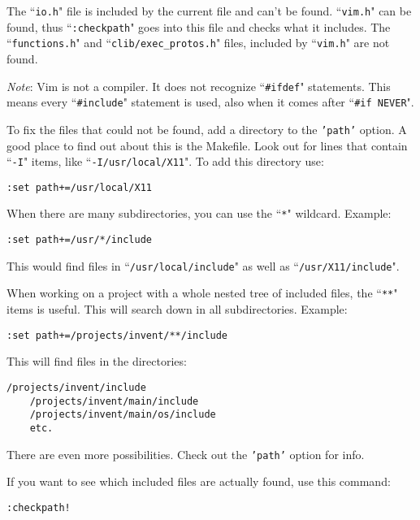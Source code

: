 The ``\texttt{io.h}" file is included by the current file and can't be found.
``\texttt{vim.h}" can be found, thus ``\texttt{:checkpath}" goes into this file and checks what it includes.
The ``\texttt{functions.h}" and ``\texttt{clib/exec\_protos.h}" files, included by ``\texttt{vim.h}" are not found.

\emph{Note}:
Vim is not a compiler.
It does not recognize ``\texttt{\#ifdef}" statements.
This means every ``\texttt{\#include}" statement is used, also when it comes after ``\texttt{\#if NEVER}".

To fix the files that could not be found, add a directory to the \texttt{'path'} option.
A good place to find out about this is the Makefile.
Look out for lines that contain ``\texttt{-I}" items, like ``\texttt{-I/usr/local/X11}".
To add this directory use:

\begin{Verbatim}[samepage=true]
 :set path+=/usr/local/X11
\end{Verbatim}

When there are many subdirectories, you can use the ``\texttt{*}" wildcard.
Example:

\begin{Verbatim}[samepage=true]
 :set path+=/usr/*/include
\end{Verbatim}

This would find files in ``\texttt{/usr/local/include}" as well as ``\texttt{/usr/X11/include}".

When working on a project with a whole nested tree of included files, the ``\texttt{**}" items is useful.
This will search down in all subdirectories.
Example:

\begin{Verbatim}[samepage=true]
 :set path+=/projects/invent/**/include
\end{Verbatim}

This will find files in the directories:

\begin{Verbatim}[samepage=true]
    /projects/invent/include
    /projects/invent/main/include
    /projects/invent/main/os/include
    etc.
\end{Verbatim}

There are even more possibilities.
Check out the \texttt{'path'} option for info.

If you want to see which included files are actually found, use this command:

\begin{Verbatim}[samepage=true]
 :checkpath!
\end{Verbatim}

